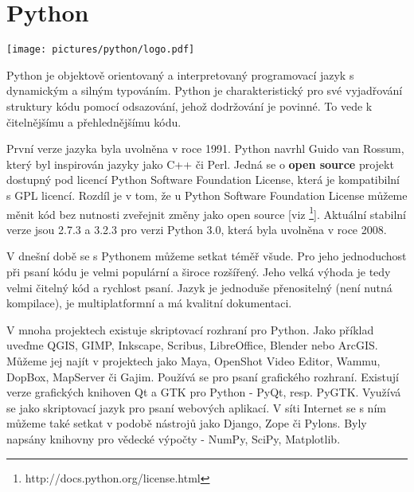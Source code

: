 \newpage
\section{Python}
\nocite{py3:book}


\begin{center}
	\texttt{[image: pictures/python/logo.pdf]}
\end{center}

Python je objektově orientovaný a interpretovaný programovací jazyk s dynamickým a silným typováním. Python je charakteristický pro své vyjadřování struktury kódu pomocí odsazování, jehož dodržování je povinné. To vede k čitelnějšímu a přehlednějšímu kódu. 

První verze jazyka byla uvolněna v roce 1991. Python navrhl Guido van Rossum, který byl inspirován jazyky jako C++ či Perl. Jedná se o \textbf{open source} projekt dostupný pod licencí Python Software Foundation License, která je kompatibilní s GPL licencí. Rozdíl je v tom, že u Python Software Foundation License můžeme měnit kód bez nutnosti zveřejnit změny jako open source [viz \footnote{http://docs.python.org/license.html}]. Aktuální stabilní verze jsou 2.7.3 a 3.2.3 pro verzi Python 3.0, která byla uvolněna v roce 2008. 



V dnešní době se s Pythonem můžeme setkat téměř všude. Pro jeho jednoduchost při psaní kódu je velmi populární a široce rozšířený. Jeho velká výhoda je tedy velmi čitelný kód a rychlost psaní.
Jazyk je jednoduše přenositelný (není nutná kompilace), je multiplatformní a má kvalitní dokumentaci. 

V mnoha projektech existuje skriptovací rozhraní pro Python. Jako příklad uveďme QGIS, GIMP, Inkscape, Scribus, LibreOffice, Blender nebo ArcGIS. Můžeme jej najít v projektech jako Maya, OpenShot Video Editor, Wammu, DopBox, MapServer či Gajim. Používá se pro psaní grafického rozhraní. Existují verze grafických knihoven Qt a GTK pro Python - PyQt, resp. PyGTK. Využívá se jako skriptovací jazyk pro psaní webových aplikací. V síti Internet se s ním můžeme také setkat v podobě nástrojů jako Django, Zope či Pylons. Byly napsány knihovny pro vědecké výpočty - NumPy, SciPy, Matplotlib.


